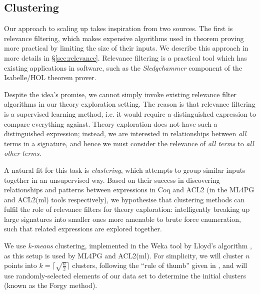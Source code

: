 \subsection{Clustering}
\label{sec:clustering}

Our approach to scaling up \qspec{} takes inspiration from two sources. The first is relevance filtering, which makes expensive algorithms used in theorem proving more practical by limiting the size of their inputs. We describe this approach in more details in \S \ref{sec:relevance}. Relevance filtering is a practical tool which has existing applications in software, such as the \emph{Sledgehammer} component of the Isabelle/HOL theorem prover.

Despite the idea's promise, we cannot simply invoke existing relevance filter algorithms in our theory exploration setting. The reason is that relevance filtering is a supervised learning method, i.e. it would require a distinguished expression to compare everything against. Theory exploration does not have such a distinguished expression; instead, we are interested in relationships between \emph{all} terms in a signature, and hence we must consider the relevance of \emph{all terms} to \emph{all other terms}.

A natural fit for this task is \emph{clustering}, which attempts to group similar inputs together in an unsupervised way. Based on their success in discovering relationships and patterns between expressions in Coq and ACL2 (in the ML4PG and ACL2(ml) tools respectively), we hypothesise that clustering methods can fulfil the role of relevance filters for theory exploration: intelligently breaking up large signatures into smaller ones more amenable to brute force enumeration, such that related expressions are explored together.

We use \emph{k-means} clustering, implemented in the Weka tool \cite{Holmes.Donkin.Witten:1994} by Lloyd's algorithm \cite{lloyd1982least}, as this setup is used by ML4PG and ACL2(ml). For simplicity, we will cluster $n$ points into $k = \lceil \sqrt{\frac{n}{2}} \rceil$ clusters, following the ``rule of thumb'' given in \cite[pp. 365]{mardia1979multivariate}, and will use randomly-selected elements of our data set to determine the initial clusters (known as the Forgy method).
